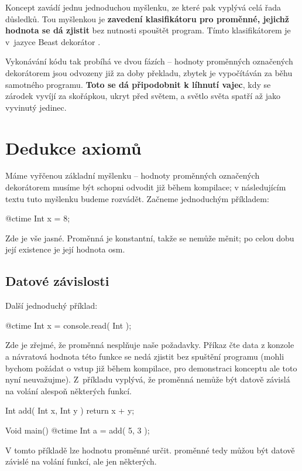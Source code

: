 Koncept zavádí jednu jednoduchou myšlenku, ze které pak vyplývá celá řada důsledků. Tou myšlenkou je \textbf{zavedení klasifikátoru pro proměnné, jejichž hodnota se dá zjistit} bez nutnosti spouštět program. Tímto klasifikátorem je v~jazyce Beast dekorátor \ctime.

Vykonávání kódu tak probíhá ve dvou fázích -- hodnoty proměnných označených dekorátorem \ctime jsou odvozeny již za doby překladu, zbytek je vypočítáván za běhu samotného programu. \textbf{Toto se dá připodobnit k líhnutí vajec}, kdy se zárodek vyvíjí za skořápkou, ukryt před světem, a světlo světa spatří až jako vyvinutý jedinec.

\section{Dedukce axiomů}
Máme vyřčenou základní myšlenku -- hodnoty proměnných označených dekorátorem \ctime musíme být schopni odvodit již během kompilace; v následujícím textu tuto myšlenku budeme rozvádět. Začneme jednoduchým příkladem:

\begin{code}
@ctime Int x = 8;
\end{code}

Zde je vše jasné. Proměnná je konstantní, takže se nemůže měnit; po celou dobu její existence je její hodnota osm.

\subsection{Datové závislosti} \label{ctimeDataDependency}
Další jednoduchý příklad:

\begin{code}
@ctime Int x = console.read( Int );
\end{code}

Zde je zřejmé, že proměnná  nesplňuje naše požadavky. Příkaz  čte data z konzole a návratová hodnota této funkce se nedá zjistit bez spuštění programu (mohli bychom požádat o vstup již během kompilace, pro demonstraci konceptu ale toto nyní neuvažujme). Z~příkladu vyplývá, že \ctime proměnná nemůže být datově závislá na volání alespoň některých funkcí.

\begin{code}
Int add( Int x, Int y ) {
	return x + y;
}

Void main() {
	@ctime Int a = add( 5, 3 );
}
\end{code}
V tomto příkladě lze hodnotu proměnné  určit. \ctime proměnné tedy můžou být datově závislé na volání funkcí, ale jen některých.

